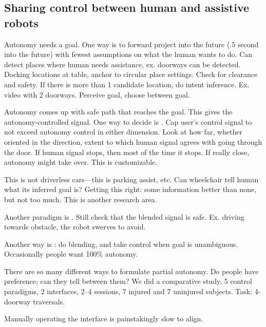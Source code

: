 \subsection{ Sharing control between human and assistive robots}

Autonomy needs a goal. One way is to forward project into the future (.5 second into the future) with fewest assumptions on what the human wants to do. Can detect places where human needs assistance, ex. doorways can be detected. Docking locations at table, anchor to circular place settings. Check for clearance and safety. If there is more than 1 candidate location, do intent inference. Ex. video with 2 doorways. Perceive goal, choose between goal.

Autonomy comes up with safe path that reaches the goal. This gives the autonomy-controlled signal. One way to decide is . Cap user's control signal to not exceed autonomy control in either dimension.
Look at how far, whether oriented in the direction, extent to which human signal agrees with going through the door. If human signal stops, then most of the time it stops. If really close, autonomy might take over. This is customizable. 

This is not driverless cars---this is parking assist, etc. %
Can wheelchair tell human what its inferred goal is?  Getting this right: some information better than none, but not too much. This is another research area.

Another paradigm is . Still check that the blended  signal is safe. Ex. driving towards obstacle, the robot swerves to avoid.


Another way is : do blending, and take control when goal is unambiguous. Occasionally people want 100\% autonomy.

There are so many different ways to formulate partial autonomy. Do people have preference; can they tell between them?
We did a comparative study, 5 control paradigms, 2 interfaces, 2--4 sessions, 7 injured and 7 uninjured subjects. Task: 4-doorway traversals.

Manually operating the interface is painstakingly slow to align.

